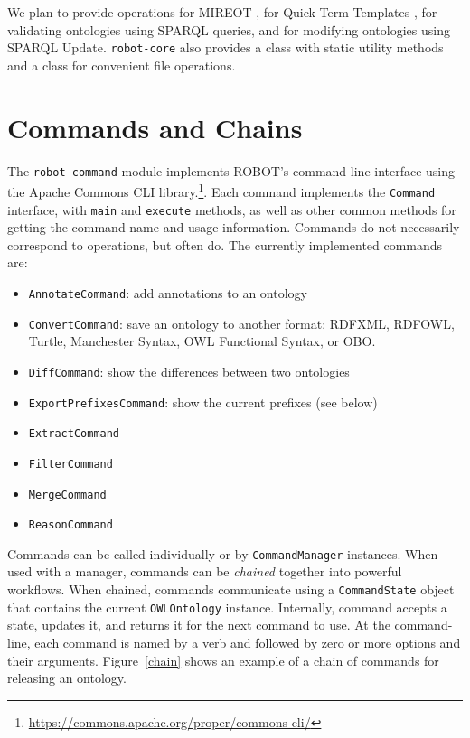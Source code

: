 \documentclass{icbo}
\begin{document}
We plan to provide operations for MIREOT \citep{Courtot2011}, for Quick Term Templates \citep{RoccaSerra2011}, for validating ontologies using SPARQL queries, and for modifying ontologies using SPARQL Update. {\tt robot-core} also provides a class with static utility methods and a class for convenient file operations.


\section{Commands and Chains}

The {\tt robot-command} module implements ROBOT's command-line interface using the Apache Commons CLI library.\footnote{\url{https://commons.apache.org/proper/commons-cli/}}. Each command implements the {\tt Command} interface, with {\tt main} and {\tt execute} methods, as well as other common methods for getting the command name and usage information. Commands do not necessarily correspond to operations, but often do. The currently implemented commands are:

\begin{itemize}
  \item {\tt AnnotateCommand}: add annotations to an ontology
  \item {\tt ConvertCommand}: save an ontology to another format: RDFXML, RDFOWL, Turtle, Manchester Syntax, OWL Functional Syntax, or OBO.
  \item {\tt DiffCommand}: show the differences between two ontologies
  \item {\tt ExportPrefixesCommand}: show the current prefixes (see below)
  \item {\tt ExtractCommand}
  \item {\tt FilterCommand}
  \item {\tt MergeCommand}
  \item {\tt ReasonCommand}
\end{itemize}

Commands can be called individually or by {\tt CommandManager} instances. When used with a manager, commands can be {\it chained} together into powerful workflows. When chained, commands communicate using a {\tt CommandState} object that contains the current {\tt OWLOntology} instance. Internally, command accepts a state, updates it, and returns it for the next command to use. At the command-line, each command is named by a verb and followed by zero or more options and their arguments. Figure~\ref{chain} shows an example of a chain of commands for releasing an ontology.
\end{document}

